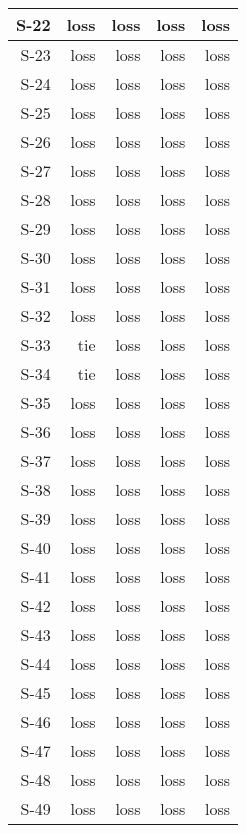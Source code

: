 \begin{tabular}{ | r | r | r | r | r | }
    \hline
         S-22  &   loss  &   loss  &   loss  &   loss  \\
    \hline
         S-23  &   loss  &   loss  &   loss  &   loss  \\
    \hline
         S-24  &   loss  &   loss  &   loss  &   loss  \\
    \hline
         S-25  &   loss  &   loss  &   loss  &   loss  \\
    \hline
         S-26  &   loss  &   loss  &   loss  &   loss  \\
    \hline
         S-27  &   loss  &   loss  &   loss  &   loss  \\
    \hline
         S-28  &   loss  &   loss  &   loss  &   loss  \\
    \hline
         S-29  &   loss  &   loss  &   loss  &   loss  \\
    \hline
         S-30  &   loss  &   loss  &   loss  &   loss  \\
    \hline
         S-31  &   loss  &   loss  &   loss  &   loss  \\
    \hline
         S-32  &   loss  &   loss  &   loss  &   loss  \\
    \hline
         S-33  &    tie  &   loss  &   loss  &   loss  \\
    \hline
         S-34  &    tie  &   loss  &   loss  &   loss  \\
    \hline
         S-35  &   loss  &   loss  &   loss  &   loss  \\
    \hline
         S-36  &   loss  &   loss  &   loss  &   loss  \\
    \hline
         S-37  &   loss  &   loss  &   loss  &   loss  \\
    \hline
         S-38  &   loss  &   loss  &   loss  &   loss  \\
    \hline
         S-39  &   loss  &   loss  &   loss  &   loss  \\
    \hline
         S-40  &   loss  &   loss  &   loss  &   loss  \\
    \hline
         S-41  &   loss  &   loss  &   loss  &   loss  \\
    \hline
         S-42  &   loss  &   loss  &   loss  &   loss  \\
    \hline
         S-43  &   loss  &   loss  &   loss  &   loss  \\
    \hline
         S-44  &   loss  &   loss  &   loss  &   loss  \\
    \hline
         S-45  &   loss  &   loss  &   loss  &   loss  \\
    \hline
         S-46  &   loss  &   loss  &   loss  &   loss  \\
    \hline
         S-47  &   loss  &   loss  &   loss  &   loss  \\
    \hline
         S-48  &   loss  &   loss  &   loss  &   loss  \\
    \hline
         S-49  &   loss  &   loss  &   loss  &   loss  \\
    \hline
\end{tabular}


